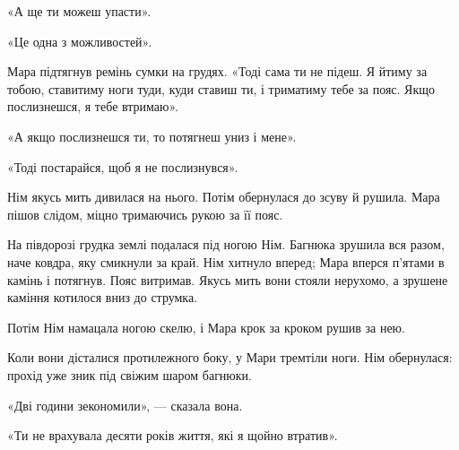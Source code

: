 \documentclass[10pt,a4paper]{article}
\begin{document}
«А ще ти можеш упасти».

«Це одна з можливостей».

Мара підтягнув ремінь сумки на грудях. «Тоді сама ти не підеш. Я йтиму за тобою, ставитиму ноги туди, куди ставиш ти, і триматиму тебе за пояс. Якщо послизнешся, я тебе втримаю».

«А якщо послизнешся ти, то потягнеш униз і мене».

«Тоді постарайся, щоб я не послизнувся».

Нім якусь мить дивилася на нього. Потім обернулася до зсуву й рушила. Мара пішов слідом, міцно тримаючись рукою за її пояс.

На півдорозі грудка землі подалася під ногою Нім. Багнюка зрушила вся разом, наче ковдра, яку смикнули за край. Нім хитнуло вперед; Мара вперся п’ятами в камінь і потягнув. Пояс витримав. Якусь мить вони стояли нерухомо, а зрушене каміння котилося вниз до струмка.

Потім Нім намацала ногою скелю, і Мара крок за кроком рушив за нею.

Коли вони дісталися протилежного боку, у Мари тремтіли ноги. Нім обернулася: прохід уже зник під свіжим шаром багнюки.

«Дві години зекономили», --- сказала вона.

«Ти не врахувала десяти років життя, які я щойно втратив».
\end{document}
